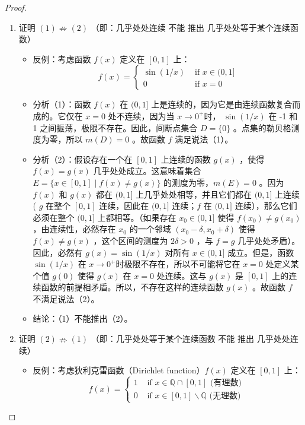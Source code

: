 \begin{proof}

\begin{enumerate}
	\item 证明 $(1) \nRightarrow(2)$
（即：几乎处处连续 不能 推出 几乎处处等于某个连续函数）
	\begin{itemize}
		\item 反例：考虑函数 $f(x)$ 定义在 $[0,1]$ 上：
\[
f(x)= \begin{cases}\sin (1 / x) & \text { if } x \in(0,1] \\ 0 & \text { if } x=0\end{cases}
\]		\item 分析（1）：函数 $f(x)$ 在 $(0,1]$ 上是连续的，因为它是由连续函数复合而成的。它仅在 $x=0$ 处不连续，因为当 $x \rightarrow 0^{+}$时， $\sin (1 / x)$ 在 -1 和 1 之间振荡，极限不存在。因此，间断点集合 $D=\{0\}$ 。点集的勒贝格测度为零，所以 $m(D)=0$ 。故函数 $f$ 满足说法（1）。
		\item 分析（2）：假设存在一个在 $[0,1]$ 上连续的函数 $g(x)$ ，使得 $f(x)=g(x)$ 几乎处处成立。这意味着集合 $E=\{x \in[0,1] \mid f(x) \neq g(x)\}$ 的测度为零，$m(E)=0$ 。因为 $f(x)$ 和 $g(x)$ 都在 $(0,1]$ 上几乎处处相等，并且它们都在 $(0,1]$ 上连续 ( $g$ 在整个 $[0,1]$ 连续，因此在 $(0,1]$ 连续；$f$ 在 $(0,1]$ 连续），那么它们必须在整个 $(0,1]$ 上都相等。（如果存在 $x_0 \in(0,1]$ 使得 $f\left(x_0\right) \neq g\left(x_0\right)$ ，由连续性，必然存在 $x_0$ 的一个邻域 $\left(x_0-\delta, x_0+\delta\right)$ 使得 $f(x) \neq g(x)$ ，这个区间的测度为 $2 \delta>0$ ，与 $f=g$ 几乎处处矛盾）。因此，必然有 $g(x)=\sin (1 / x)$ 对所有 $x \in(0,1]$ 成立。但是，函数 $\sin (1 / x)$ 在 $x \rightarrow 0^{+}$时极限不存在，所以不可能将它在 $x=0$ 处定义某个值 $g(0)$ 使得 $g(x)$ 在 $x=0$ 处连续。这与 $g(x)$ 是 $[0,1]$ 上的连续函数的前提相矛盾。所以，不存在这样的连续函数 $g(x)$ 。故函数 $f$ 不满足说法（2）。
		\item 结论：（1）不能推出（2）。
	\end{itemize}
	\item 证明 $(2) \nRightarrow(1)$
（即：几乎处处等于某个连续函数 不能 推出 几乎处处连续）
	\begin{itemize}
		\item 反例：考虑狄利克雷函数（Dirichlet function）$f(x)$ 定义在 $[0,1]$ 上：
\[
f(x)= \begin{cases}1 & \text { if } x \in \mathbb{Q} \cap[0,1] \text { (有理数) } \\ 0 & \text { if } x \in[0,1] \backslash \mathbb{Q} \text { (无理数) }\end{cases}
\]
\end{itemize}
\end{enumerate}
\end{proof}
